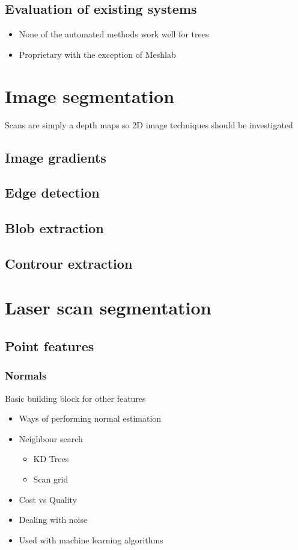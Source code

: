 	\subsection{Evaluation of existing systems}
		\begin{itemize}
		\item None of the automated methods work well for trees
		\item Proprietary with the exception of Meshlab
		\end{itemize}		

\section{Image segmentation}
	Scans are simply a depth maps so 2D image techniques should be investigated
	\subsection{Image gradients}
	\subsection{Edge detection}
	\subsection{Blob extraction}
	\subsection{Controur extraction}

\section{Laser scan segmentation}
	\subsection{Point features}
		\subsubsection{Normals}
			Basic building block for other features
			\begin{itemize}
			\item Ways of performing normal estimation
			\item Neighbour search
				\begin{itemize}
				\item KD Trees
				\item Scan grid
				\end{itemize}
			\item Cost vs Quality
			\item Dealing with noise
			\item Used with machine learning algorithms
			\end{itemize}
				
